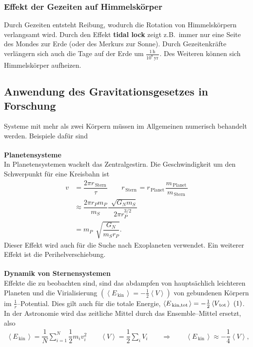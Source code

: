 \documentclass[a4paper,12pt]{article}
\newcommand\inlineeqno{\stepcounter{equation}\ {(\theequation)}}
\numberwithin{equation}{section}
\begin{document}
\subsubsection{Effekt der Gezeiten auf Himmelskörper}
Durch Gezeiten entsteht Reibung, wodurch die Rotation von Himmelskörpern verlangsamt wird. Durch den Effekt \textbf{tidal lock} zeigt z.B.\ immer nur eine Seite des Mondes zur Erde (oder des Merkurs zur Sonne). Durch Gezeitenkräfte verlängern sich auch die Tage auf der Erde um $\tfrac{1\,\text{h}\,}{10^8\,\text{yr}\,}$. Des Weiteren können sich Himmelskörper aufheizen.

\subsection{Anwendung des Gravitationsgesetzes in Forschung}
Systeme mit mehr als zwei Körpern müssen im Allgemeinen numerisch behandelt werden. Beispiele dafür sind
\\\hfill\\\textbf{Planetensysteme}\\ 
In Planetensystemen \glqq wackelt\grqq{} das Zentralgestirn. Die Geschwindigkeit um den Schwerpunkt für eine Kreisbahn ist
\begin{align*} 
        v&=\dfrac{2\pi r_{\,\text{Stern}\,}}{\tau }\qquad r_{\,\text{Stern}\,}=r_{\,\text{Planet}\,}\dfrac{m_{\,\text{Planet}\,}}{m_{\,\text{Stern}\,}}\nonumber \\
         &\approx \dfrac{2\pi r_Pm_P}{m_S}\dfrac{\,\sqrt[]{G_Nm_S}}{2\pi r_P^{3/2}}\nonumber \\
         &=m_P\,\sqrt[]{\dfrac{G_N}{m_Sr_P}}
.\end{align*} 
Dieser Effekt wird auch für die Suche nach Exoplaneten verwendet. Ein weiterer Effekt ist die Perihelverschiebung.
\\\hfill\\\textbf{Dynamik von Sternensystemen}\\ 
Effekte die zu beobachten sind, sind das \glqq abdampfen\grqq{} von hauptsächlich leichteren Planeten und die \glqq Virialisierung\grqq{} $\left(\left\langle E_{\,\text{kin}\,}\right\rangle =-\tfrac{1}{2}\left\langle V\right\rangle \right)$  von gebundenen Körpern im $\tfrac{1}{r}$--Potential. Dies gilt auch für die totale Energie, $\left\langle E_{\,\text{kin,tot}\,}\right\rangle =-\tfrac{1}{2}\left\langle V_{\,\text{tot}\,}\right\rangle \inlineeqno\label{eq:8.22}$. In der Astronomie wird das zeitliche Mittel durch das \glqq Ensemble--Mittel\grqq{} ersetzt, also
\begin{align*} 
        \left\langle E_{\,\text{kin}\,}\right\rangle =\dfrac{1}{N}\sum_{i=1}^{N}\dfrac{1}{2}m_iv_i^2\qquad \left\langle V\right\rangle =\dfrac{1}{2}\sum_{i}^{}V_i\qquad \Rightarrow \qquad \left\langle E_{\,\text{kin}\,}\right\rangle \approx -\dfrac{1}{4}\left\langle V\right\rangle 
,\end{align*} 
\end{document}
